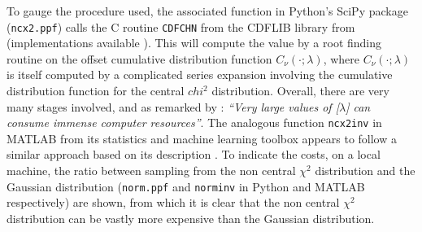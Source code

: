 \documentclass[manuscript,review]{acmart}
\begin{document}
To gauge the procedure used, the associated function in Python's SciPy package (\texttt{ncx2.ppf}) calls the C routine \texttt{CDFCHN} from the CDFLIB library from \citet{brown1994dcdflib} (implementations available \citep{burkardt2020cdflib}). This will compute the value by a root finding routine \citep[algorithm~R]{bus1975two} on the offset cumulative distribution function $ C_\nu(\cdot;\lambda) $, where $ C_\nu(\cdot;\lambda) $ is itself computed by a complicated series expansion \citep[(26.4.25)]{abramowitz1948handbook} involving the cumulative distribution function for the central $ chi^2 $ distribution. Overall, there are very many stages involved, and as remarked by \citet[\texttt{cdflib.c}]{burkardt2020cdflib}: \textit{``Very large values of
[$ \lambda $] can consume immense computer resources''}. The analogous function \texttt{ncx2inv} in MATLAB from its statistics and machine learning toolbox appears to follow a similar approach based on its description \citep[page~4301]{matlab2018statistics}. To indicate the costs, on a local machine, the ratio between sampling from the non central $ \chi^2 $ distribution and the Gaussian distribution (\texttt{norm.ppf} and \texttt{norminv} in Python and MATLAB respectively) are shown, from which it is clear that the non central $ \chi^2 $ distribution can be vastly more expensive than the Gaussian distribution. 
\end{document}
